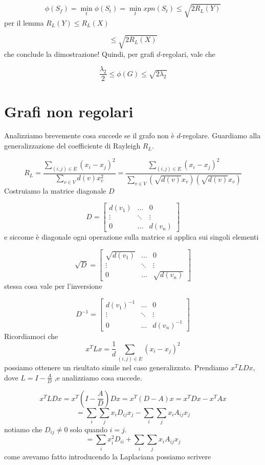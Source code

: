\documentclass[12pt]{report}
\begin{document}
$$\phi(S_f) = \min_t{\phi(S_t)} = \min_t xpn(S_t) \leq \sqrt{2 R_L(Y)}$$
per il lemma $R_L(Y) \leq R_L(X)$

$$\leq \sqrt{2 R_L(X)}$$
che conclude la dimostrazione!
Quindi, per grafi $d$-regolari,  vale che 


$$\frac{\lambda_2}{2} \leq \phi(G) \leq \sqrt{2 \lambda_2}$$

\section{Grafi non regolari}
Analizziamo brevemente cosa succede se il grafo non è $d$-regolare. Guardiamo alla generalizzazione del coefficiente di Rayleigh $R_L$.

$$R_L = \frac{\sum_{(i,j) \in E} (x_i - x_j)^2}{\sum_{v \in V} d(v) x_v^2} =  \frac{\sum_{(i,j) \in E} (x_i - x_j)^2}{\sum_{v \in V} (\sqrt{d(v)} x_v) (\sqrt{d(v)} x_v)}$$
Costruiamo la matrice diagonale $D$

\[
    D = \begin{bmatrix}
        d(v_1)& \dots & 0 \\ 
        \vdots & \ddots & \vdots \\ 
        0 & \dots & d(v_n) 
    \end{bmatrix}
\]
e siccome è diagonale ogni operazione sulla matrice si applica sui singoli elementi

\[
    \sqrt{D} = \begin{bmatrix}
        \sqrt{d(v_1)}& \dots & 0 \\ 
        \vdots & \ddots & \vdots \\ 
        0 & \dots & \sqrt{d(v_n)} 
    \end{bmatrix}
\]
stessa cosa vale per l'inversione

\[
    D^{-1} = \begin{bmatrix}
        d(v_1)^{-1}& \dots & 0 \\ 
        \vdots & \ddots & \vdots \\ 
        0 & \dots & d(v_n)^{-1} 
    \end{bmatrix}
\]
Ricordiamoci che $$x^T L x = \frac{1}{d} \sum_{(i,j) \in E} (x_i - x_j)^2$$ possiamo ottenere un risultato simile nel caso generalizzato.
Prendiamo $x^T L D x$, dove $L = I - \frac{A}{D}$ ,e analizziamo cosa succede.

$$x^T L D x = x^T (I - \frac{A}{D}) D x = x^T (D - A) x = x^T D x - x^T A x$$
$$= \sum_i \sum_j x_i D_{ij} x_j - \sum_i \sum_j x_i A_{ij} x_j$$
notiamo che $D_{ij} \neq 0$ solo quando $i = j$.
$$= \sum_i x_i^2 D_{ii} + \sum_i \sum_j x_i A_{ij} x_j $$
come avevamo fatto introducendo la Laplaciana possiamo scrivere
\end{document}
